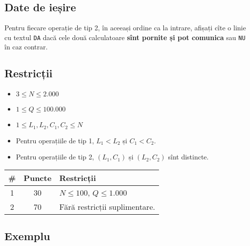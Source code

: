 \documentclass{article}
\begin{document}
\subsection*{Date de ieșire}

Pentru fiecare operație de tip 2, în aceeași ordine ca la intrare, afișați cîte o linie cu textul \texttt{DA} dacă cele două calculatoare \textbf{sînt pornite și pot comunica} sau \texttt{NU} în caz contrar.

\subsection*{Restricții}

\begin{itemize}
\item $3 \leq N \leq 2.000$
\item $1 \leq Q \leq 100.000$
\item $1 \leq L_1, L_2, C_1, C_2 \leq N$
\item Pentru operațiile de tip 1, $L_1 < L_2$ și $C_1 < C_2$.
\item Pentru operațiile de tip 2, $(L_1, C_1)$ și $(L_2, C_2)$ sînt distincte.
\end{itemize}

\begin{table}[H]
\setlength{\tabcolsep}{30pt}
\begin{tabular}{ccl} \toprule
    \textbf{\#} & \textbf{Puncte} & \textbf{Restricții} \\ \midrule
    1  & 30 & $N \leq 100$, $Q \leq 1.000$ \\
    2  & 70 & Fără restricții suplimentare. \\ \bottomrule
\end{tabular}
\end{table}

\subsection*{Exemplu}
\end{document}
